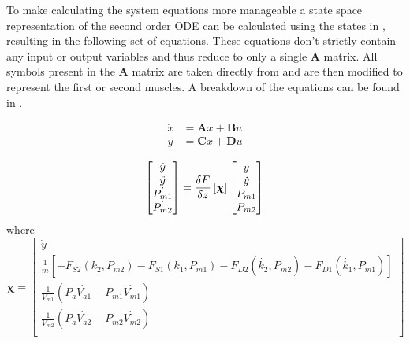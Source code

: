 \documentclass[11pt,a4paper]{article}
\begin{document}
To make calculating the system equations more manageable a state space representation  of the second order ODE can be calculated using the states in , resulting in the following set of equations. These equations don't strictly contain any input or output variables and thus reduce to only a single $\boldsymbol{A}$ matrix. All symbols present in the $\boldsymbol{A}$ matrix are taken directly from  and are then modified to represent the first or second muscles. A breakdown of the equations can be found in .\newline

\begin{align}
    \label{math:state_space_representation}
    \dot{x} &= \boldsymbol{A}x + \boldsymbol{B}u\\
    y &= \boldsymbol{C}x + \boldsymbol{D}u\nonumber 
\end{align}

\begin{equation}
\begin{bmatrix}
        \dot{y}\\
        \ddot{y}\\
        \dot{P_{m1}}\\
        \dot{P_{m2}}\\
    \end{bmatrix}
    = \fdv{F}{z}\left[\boldsymbol{\chi}\right]
    \begin{bmatrix}
        y\\
        \dot{y}\\
        P_{m1}\\
        P_{m2}\\
    \end{bmatrix}
    \label{math:state_space_matrix}
\end{equation}
where
\begin{equation*}
        \boldsymbol{\chi} = 
    \begin{bmatrix}
        \dot{y}\\
        \frac{1}{m}[-F_{S2}(k_2,P_{m2})-F_{S1}(k_1,P_{m1})-F_{D2}(\dot{k_2},P_{m2})-F_{D1}(\dot{k_1},P_{m1})]\\
        \frac{1}{V_{m1}}(P_a\dot{V_{a1}}-P_{m1}\dot{V_{m1}})\\
        \frac{1}{V_{m2}}(P_a\dot{V_{a2}}-P_{m2}\dot{V_{m2}})\\
    \end{bmatrix}
\end{equation*}
\end{document}
